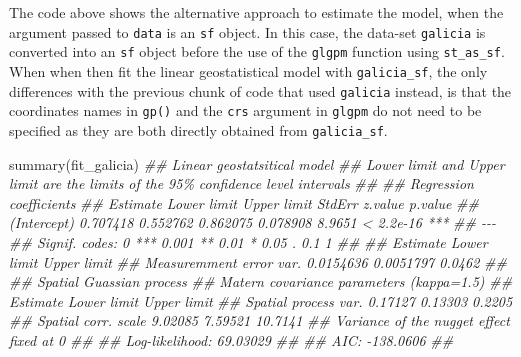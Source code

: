 \documentclass[
  letterpaper,
]{krantz}
\newenvironment{Shaded}{\begin{snugshade}}{\end{snugshade}}
\newcommand{\DocumentationTok}[1]{\textcolor[rgb]{0.37,0.37,0.37}{\textit{#1}}}
\newcommand{\FunctionTok}[1]{\textcolor[rgb]{0.28,0.35,0.67}{#1}}
\newcommand{\NormalTok}[1]{\textcolor[rgb]{0.00,0.23,0.31}{#1}}
\begin{document}
The code above shows the alternative approach to estimate the model,
when the argument passed to \texttt{data} is an \texttt{sf} object. In
this case, the data-set \texttt{galicia} is converted into an
\texttt{sf} object before the use of the \texttt{glgpm} function using
\texttt{st\_as\_sf}. When when then fit the linear geostatistical model
with \texttt{galicia\_sf}, the only differences with the previous chunk
of code that used \texttt{galicia} instead, is that the coordinates
names in \texttt{gp()} and the \texttt{crs} argument in \texttt{glgpm}
do not need to be specified as they are both directly obtained from
\texttt{galicia\_sf}.

\begin{Shaded}
\begin{Highlighting}[]
\FunctionTok{summary}\NormalTok{(fit\_galicia)}
\DocumentationTok{\#\# Linear geostatsitical model }
\DocumentationTok{\#\# \textquotesingle{}Lower limit\textquotesingle{} and \textquotesingle{}Upper limit\textquotesingle{} are the limits of the 95\% confidence level intervals }
\DocumentationTok{\#\# }
\DocumentationTok{\#\#  Regression coefficients }
\DocumentationTok{\#\#             Estimate Lower limit Upper limit   StdErr z.value   p.value    }
\DocumentationTok{\#\# (Intercept) 0.707418    0.552762    0.862075 0.078908  8.9651 \textless{} 2.2e{-}16 ***}
\DocumentationTok{\#\# {-}{-}{-}}
\DocumentationTok{\#\# Signif. codes:  0 \textquotesingle{}***\textquotesingle{} 0.001 \textquotesingle{}**\textquotesingle{} 0.01 \textquotesingle{}*\textquotesingle{} 0.05 \textquotesingle{}.\textquotesingle{} 0.1 \textquotesingle{} \textquotesingle{} 1}
\DocumentationTok{\#\# }
\DocumentationTok{\#\#                           Estimate Lower limit Upper limit}
\DocumentationTok{\#\# Measuremment error var. 0.0154636   0.0051797      0.0462}
\DocumentationTok{\#\# }
\DocumentationTok{\#\#  Spatial Guassian process }
\DocumentationTok{\#\# Matern covariance parameters (kappa=1.5) }
\DocumentationTok{\#\#                      Estimate Lower limit Upper limit}
\DocumentationTok{\#\# Spatial process var.  0.17127     0.13303      0.2205}
\DocumentationTok{\#\# Spatial corr. scale   9.02085     7.59521     10.7141}
\DocumentationTok{\#\# Variance of the nugget effect fixed at 0 }
\DocumentationTok{\#\# }
\DocumentationTok{\#\#  Log{-}likelihood: 69.03029}
\DocumentationTok{\#\# }
\DocumentationTok{\#\#  AIC: {-}138.0606}
\DocumentationTok{\#\# }
\end{Highlighting}
\end{Shaded}
\end{document}
